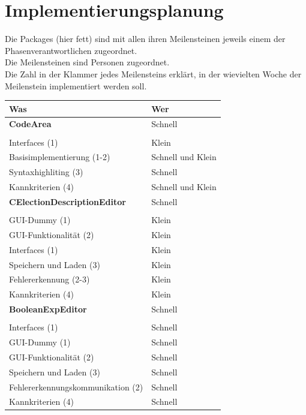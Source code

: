 \documentclass[a4paper]{scrreprt}
\begin{document}
\chapter{Implementierungsplanung}
Die Packages (hier fett) sind mit allen ihren Meilensteinen jeweils einem der Phasenverantwortlichen zugeordnet. \\
Die Meilensteinen sind Personen zugeordnet. \\
Die Zahl in der Klammer jedes Meilensteins erklärt, in der wievielten Woche der Meilenstein implementiert werden soll. \\
\begin{tabular}{ | p{7cm} | p{7cm} |}
    \hline
	Was & Wer\\
	\hline
	
	\rule{0pt}{15pt}\textbf {CodeArea} & Schnell\\
	&\\
	\hline
	Interfaces (1) & Klein\\
	\hline
	Basisimplementierung (1-2) & Schnell und Klein\\
	\hline
	Syntaxhighliting (3) & Schnell \\
	\hline
	Kannkriterien (4) & Schnell und Klein \\
	\hline
	
	\rule{0pt}{15pt}\textbf {CElectionDescriptionEditor} & Schnell\\
	&\\
	\hline
	GUI-Dummy (1) & Klein \\
	\hline
	GUI-Funktionalität (2) & Klein\\
	\hline
	Interfaces (1) & Klein\\
	\hline
	Speichern und Laden (3) & Klein\\
	\hline
	Fehlererkennung (2-3)& Klein\\
	\hline
	Kannkriterien (4) & Klein\\
	\hline
	
	\rule{0pt}{15pt}\textbf {BooleanExpEditor} &  Schnell \\
	&\\
	\hline
	Interfaces (1) & Schnell\\
	\hline
	GUI-Dummy (1) & Schnell\\
	\hline
	GUI-Funktionalität (2) & Schnell\\
	\hline
	Speichern und Laden (3) & Schnell\\
	\hline	
	Fehlererkennungskommunikation (2) & Schnell\\
	\hline
	Kannkriterien (4) & Schnell\\
	\hline
	

\end{tabular}
\end{document}
